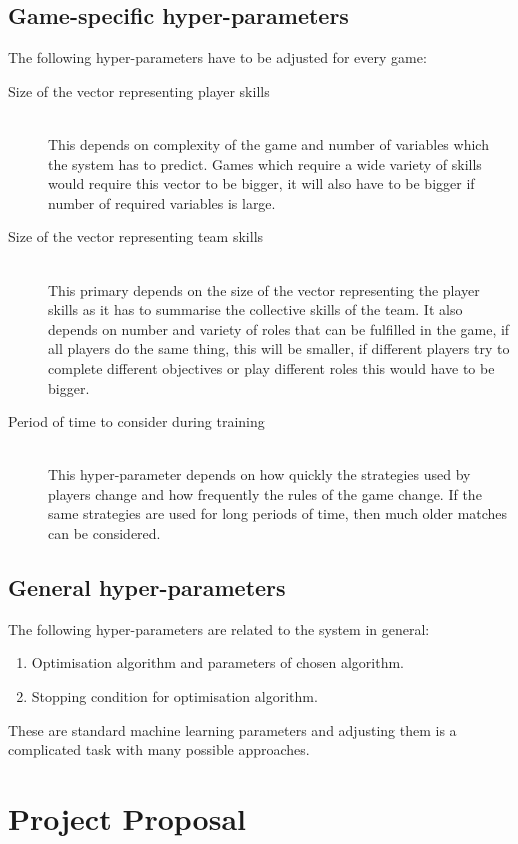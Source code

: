 \documentclass[12pt,a4paper]{book}
\begin{document}
\section{Game-specific hyper-parameters}
The following hyper-parameters have to be adjusted for every game:
\begin{description}
\item[Size of the vector representing player skills] \hfill \\
This depends on complexity of the game and number of variables which the system has to predict.
Games which require a wide variety of skills would require this vector to be bigger, it will also have to be bigger if number of required variables is large.
\item[Size of the vector representing team skills] \hfill \\
This primary depends on the size of the vector representing the player skills as it has to summarise the collective skills of the team.
It also depends on number and variety of roles that can be fulfilled in the game, if all players do the same thing, this will be smaller, if different players try to complete different objectives or play different roles this would have to be bigger.
\item[Period of time to consider during training] \hfill \\
This hyper-parameter depends on how quickly the strategies used by players change and how frequently the rules of the game change.
If the same strategies are used for long periods of time, then much older matches can be considered.
\end{description}

\section{General hyper-parameters}
The following hyper-parameters are related to the system in general:
\begin{enumerate}
\item Optimisation algorithm and parameters of chosen algorithm.
\item Stopping condition for optimisation algorithm.
\end{enumerate}
These are standard machine learning parameters and adjusting them is a complicated task with many possible approaches.

\chapter{Project Proposal}
\label{proposal}
\end{document}
